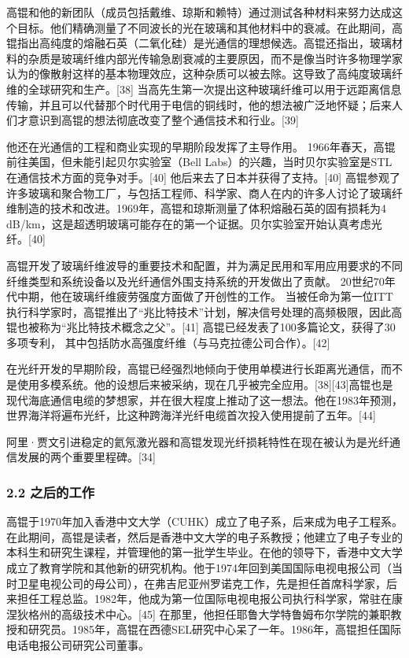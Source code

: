 高锟和他的新团队（成员包括戴维、琼斯和赖特）通过测试各种材料来努力达成这个目标。他们精确测量了不同波长的光在玻璃和其他材料中的衰减。在此期间，高锟指出高纯度的熔融石英（二氧化硅）是光通信的理想候选。高锟还指出，玻璃材料的杂质是玻璃纤维内部光传输急剧衰减的主要原因，而不是像当时许多物理学家认为的像散射这样的基本物理效应，这种杂质可以被去除。这导致了高纯度玻璃纤维的全球研究和生产。[38] 当高先生第一次提出这种玻璃纤维可以用于远距离信息传输，并且可以代替那个时代用于电信的铜线时，他的想法被广泛地怀疑；后来人们才意识到高锟的想法彻底改变了整个通信技术和行业。[39]

他还在光通信的工程和商业实现的早期阶段发挥了主导作用。 1966年春天，高锟前往美国，但未能引起贝尔实验室（Bell Labs）的兴趣，当时贝尔实验室是STL在通信技术方面的竞争对手。[40] 他后来去了日本并获得了支持。[40] 高锟参观了许多玻璃和聚合物工厂，与包括工程师、科学家、商人在内的许多人讨论了玻璃纤维制造的技术和改进。1969年，高锟和琼斯测量了体积熔融石英的固有损耗为4 dB/km，这是超透明玻璃可能存在的第一个证据。贝尔实验室开始认真考虑光纤。[40]

高锟开发了玻璃纤维波导的重要技术和配置，并为满足民用和军用应用要求的不同纤维类型和系统设备以及光纤通信外围支持系统的开发做出了贡献。 20世纪70年代中期，他在玻璃纤维疲劳强度方面做了开创性的工作。 当被任命为第一位ITT执行科学家时，高锟推出了“兆比特技术”计划，解决信号处理的高频极限，因此高锟也被称为“兆比特技术概念之父”。[41] 高锟已经发表了100多篇论文，获得了30多项专利， 其中包括防水高强度纤维（与马克拉德公司合作）。[42]

在光纤开发的早期阶段，高锟已经强烈地倾向于使用单模进行长距离光通信，而不是使用多模系统。他的设想后来被采纳，现在几乎被完全应用。[38][43]高锟也是现代海底通信电缆的梦想家，并在很大程度上推动了这一想法。他在1983年预测，世界海洋将遍布光纤，比这种跨海洋光纤电缆首次投入使用提前了五年。[44]

阿里·贾文引进稳定的氦氖激光器和高锟发现光纤损耗特性在现在被认为是光纤通信发展的两个重要里程碑。[34]

\subsubsection{2.2 之后的工作}
高锟于1970年加入香港中文大学（CUHK）成立了电子系，后来成为电子工程系。在此期间，高锟是读者，然后是香港中文大学的电子系教授；他建立了电子专业的本科生和研究生课程，并管理他的第一批学生毕业。在他的领导下，香港中文大学成立了教育学院和其他新的研究机构。他于1974年回到美国国际电视电报公司（当时卫星电视公司的母公司），在弗吉尼亚州罗诺克工作，先是担任首席科学家，后来担任工程总监。1982年，他成为第一位国际电视电报公司执行科学家，常驻在康涅狄格州的高级技术中心。[45] 在那里，他担任耶鲁大学特鲁姆布尔学院的兼职教授和研究员。1985年，高锟在西德SEL研究中心呆了一年。1986年，高锟担任国际电话电报公司研究公司董事。

